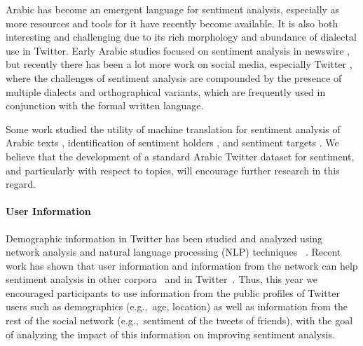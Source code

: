 \documentclass[11pt,a4paper]{article}
\begin{document}
Arabic has become an emergent language for sentiment analysis, especially as more resources and tools for it have recently become available. 
It is also both interesting and challenging due to its rich morphology and abundance of dialectal use in Twitter. 
Early Arabic studies focused on sentiment analysis in newswire \cite{abdul2011subjectivity,elarnaoty2012machine}, but recently there has been a lot more work on social media, especially Twitter \cite{mourad2013subjectivity,abdul2014samar,refaee2014subjectivity,salameh2015sentiment}, where the challenges of sentiment analysis are compounded by the presence of multiple dialects and orthographical variants, which are frequently used in conjunction with the formal written language. %

\noindent Some work studied the utility of machine translation for sentiment analysis of Arabic texts  \cite{salameh2015sentiment,mohammad2016translation,refaee2015benchmarking},
identification of sentiment holders \cite{elarnaoty2012machine}, and sentiment targets \cite{al2015human,farra2015annotating,farra2017smarties}. We believe that the development of a standard Arabic Twitter dataset for sentiment, and particularly with respect to topics, will encourage further research in this regard.

\paragraph{User Information}
Demographic information in Twitter has been studied and analyzed using network analysis and natural language processing (NLP) techniques ~\cite{mislove2011understanding,nguyen2013old,rosenthal2016social}. Recent work has shown that user information and information from the network can help sentiment analysis in other corpora~\cite{hovy2015demographic} and in Twitter~\cite{volkova2013exploring,DBLP:journals/corr/YangE15}. %
Thus, this year we encouraged participants to use information from the public profiles of Twitter users such as demographics (e.g.,~age, location) as well as information from the rest of the social network (e.g.,~sentiment of the tweets of friends), with the goal of analyzing the impact of this information on improving sentiment analysis.
\end{document}
